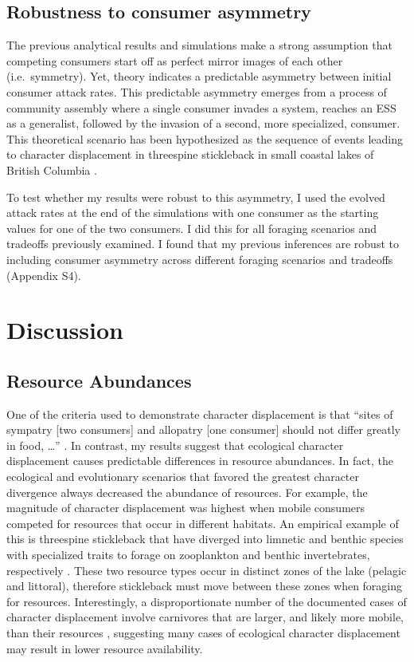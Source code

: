 \documentclass[11pt,]{article}
\begin{document}
\subsection{Robustness to consumer
asymmetry}\label{robustness-to-consumer-asymmetry}

The previous analytical results and simulations make a strong assumption
that competing consumers start off as perfect mirror images of each
other (i.e.~symmetry). Yet, theory indicates a predictable asymmetry
between initial consumer attack rates. This predictable asymmetry
emerges from a process of community assembly where a single consumer
invades a system, reaches an ESS as a generalist, followed by the
invasion of a second, more specialized, consumer. This theoretical
scenario has been hypothesized as the sequence of events leading to
character displacement in threespine stickleback in small coastal lakes
of British Columbia \citep{Schluter1992, Schluter2000}.

To test whether my results were robust to this asymmetry, I used the
evolved attack rates at the end of the simulations with one consumer as
the starting values for one of the two consumers. I did this for all
foraging scenarios and tradeoffs previously examined. I found that my
previous inferences are robust to including consumer asymmetry across
different foraging scenarios and tradeoffs (Appendix S4).

\section{Discussion}\label{discussion}

\subsection{Resource Abundances}\label{resource-abundances}

One of the criteria used to demonstrate character displacement is that
``sites of sympatry {[}two consumers{]} and allopatry {[}one consumer{]}
should not differ greatly in food, \ldots{}'' \citep{Schluter1992}. In
contrast, my results suggest that ecological character displacement
causes predictable differences in resource abundances. In fact, the
ecological and evolutionary scenarios that favored the greatest
character divergence always decreased the abundance of resources. For
example, the magnitude of character displacement was highest when mobile
consumers competed for resources that occur in different habitats. An
empirical example of this is threespine stickleback that have diverged
into limnetic and benthic species with specialized traits to forage on
zooplankton and benthic invertebrates, respectively
\citep{Schluter1992, Schluter2000}. These two resource types occur in
distinct zones of the lake (pelagic and littoral), therefore stickleback
must move between these zones when foraging for resources.
Interestingly, a disproportionate number of the documented cases of
character displacement involve carnivores \citep{Schluter2000} that are
larger, and likely more mobile, than their resources \citep{McCann2005},
suggesting many cases of ecological character displacement may result in
lower resource availability.
\end{document}
